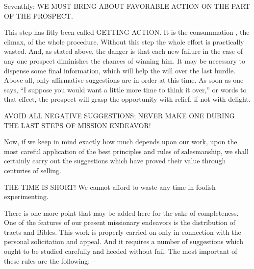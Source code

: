 \documentclass[
]{book}
\begin{document}
Seventhly: WE MUST BRING ABOUT FAVORABLE ACTION ON THE PART OF THE PROSPECT.

This step has fitly been called GETTING ACTION. It is the consummation , the climax, of the whole procedure. Without this step the whole effort is practically wasted. And, as stated above, the danger is that each new failure in the case of any one prospect diminishes the chances of winning him. It may be necessary to dispense some final information, which will help the will over the last hurdle. Above all, only affirmative suggestions are in order at this time. As soon as one says, ``I suppose you would want a little more time to think it over,'' or words to that effect, the prospect will grasp the opportunity with relief, if not with delight.

AVOID ALL NEGATIVE SUGGESTIONS; NEVER MAKE ONE DURING THE LAST STEPS OF MISSION ENDEAVOR!

Now, if we keep in mind exactly how much depends upon our work, upon the most careful application of the best principles and rules of salesmanship, we shall certainly carry out the suggestions which have proved their value through centuries of selling.

THE TIME IS SHORT! We cannot afford to waste any time in foolish experimenting.

There is one more point that may be added here for the sake of completeness. One of the features of our present missionary endeavors is the distribution of tracts and Bibles. This work is properly carried on only in eonnection with the personal solicitation and appeal. And it requires a number of suggestions which ought to be studied carefully and heeded without fail. The most important of these rules are the following: --
\end{document}
